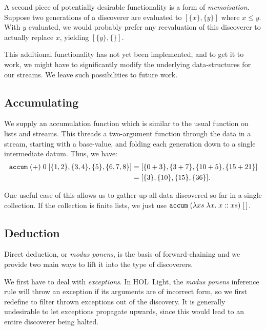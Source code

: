 A second piece of potentially desirable functionality is a form of \emph{memoisation}. Suppose two generations of a discoverer are evaluated to $[\{x\}, \{y\}]$ where $x \leq y$. With $y$ evaluated, we would probably prefer any reevaluation of this discoverer to actually replace $x$, yielding $[\{y\}, \{\}]$. 

This additional functionality has not yet been implemented, and to get it to work, we might have to significantly modify the underlying data-structures for our streams. We leave such possibilities to future work.

\subsection{Accumulating}
We supply an accumulation function which is similar to the usual  function on lists and streams. This threads a two-argument function through the data in a stream, starting with a base-value, and folding each generation down to a single intermediate datum. Thus, we have:
\begin{align*}
\texttt{accum}\;(+)\;0\;[\{1,2\}, \{3,4\}, \{5\}, \{6,7,8\}] 
&= [\{0 + 3\}, \{3 + 7\}, \{10 + 5\}, \{15 + 21\}]\\
&= [\{3\}, \{10\}, \{15\}, \{36\}].
\end{align*}

One useful case of this allows us to gather up all data discovered so far in a single collection. If the collection is finite lists, we just use $\texttt{accum}\;(\lambda xs\;\lambda x.\;x :: xs)\;[\,]$.


\subsection{Deduction}
Direct deduction, or \emph{modus ponens}, is the basis of forward-chaining and we provide two main ways to lift it into the type of discoverers. 

We first have to deal with \emph{exceptions}. In HOL~Light, the \emph{modus ponens} inference rule will throw an exception if its arguments are of incorrect form, so we first redefine  to filter thrown exceptions out of the discovery. It is generally undesirable to let exceptions propagate upwards, since this would lead to an entire discoverer being halted. 

